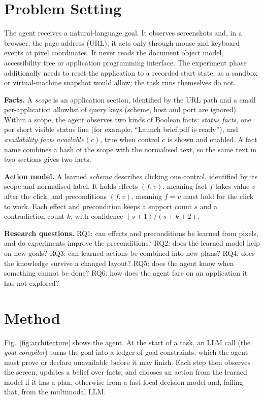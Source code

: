 \documentclass[conference]{IEEEtran}
\begin{document}
\section{Problem Setting}
The agent receives a natural-language goal. It observes screenshots and, in a browser, the page address (URL); it acts only through mouse and keyboard events at pixel coordinates. It never reads the document object model, accessibility tree or application programming interface. The experiment phase additionally needs to reset the application to a recorded start state, as a sandbox or virtual-machine snapshot would allow; the task runs themselves do not.

\textbf{Facts.} A \emph{scope} is an application section, identified by the URL path and a small per-application allowlist of query keys (scheme, host and port are ignored). Within a scope, the agent observes two kinds of Boolean facts: \emph{status facts}, one per short visible status line (for example, ``Launch brief.pdf is ready''), and \emph{availability facts} $\textit{available}(c)$, true when control $c$ is shown and enabled. A fact name combines a hash of the scope with the normalised text, so the same text in two sections gives two facts.

\textbf{Action model.} A learned \emph{schema} describes clicking one control, identified by its scope and normalised label. It holds effects $(f, v)$, meaning fact $f$ takes value $v$ after the click, and preconditions $(f, v)$, meaning $f = v$ must hold for the click to work. Each effect and precondition keeps a support count $s$ and a contradiction count $k$, with confidence $(s+1)/(s+k+2)$.

\textbf{Research questions.} RQ1: can effects and preconditions be learned from pixels, and do experiments improve the preconditions? RQ2: does the learned model help on new goals? RQ3: can learned actions be combined into new plans? RQ4: does the knowledge survive a changed layout? RQ5: does the agent know when something cannot be done? RQ6: how does the agent fare on an application it has not explored?

\section{Method}
Fig.~\ref{fig:architecture} shows the agent. At the start of a task, an LLM call (the \emph{goal compiler}) turns the goal into a ledger of goal constraints, which the agent must prove or declare unavailable before it may finish. Each step then observes the screen, updates a belief over facts, and chooses an action from the learned model if it has a plan, otherwise from a fast local decision model and, failing that, from the multimodal LLM.
\end{document}
